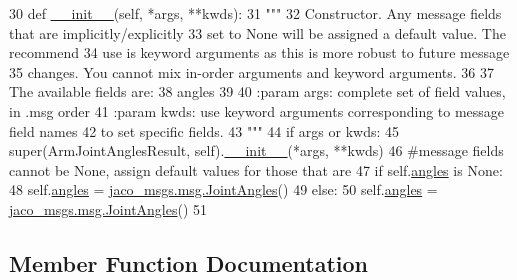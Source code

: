 \begin{DoxyCode}
30   \textcolor{keyword}{def }\hyperlink{classjaco__msgs_1_1msg_1_1__ArmJointAnglesResult_1_1ArmJointAnglesResult_a6584c0dc3193587ef66dc2ead0fc19c3}{\_\_init\_\_}(self, *args, **kwds):
31     \textcolor{stringliteral}{"""}
32 \textcolor{stringliteral}{    Constructor. Any message fields that are implicitly/explicitly}
33 \textcolor{stringliteral}{    set to None will be assigned a default value. The recommend}
34 \textcolor{stringliteral}{    use is keyword arguments as this is more robust to future message}
35 \textcolor{stringliteral}{    changes.  You cannot mix in-order arguments and keyword arguments.}
36 \textcolor{stringliteral}{}
37 \textcolor{stringliteral}{    The available fields are:}
38 \textcolor{stringliteral}{       angles}
39 \textcolor{stringliteral}{}
40 \textcolor{stringliteral}{    :param args: complete set of field values, in .msg order}
41 \textcolor{stringliteral}{    :param kwds: use keyword arguments corresponding to message field names}
42 \textcolor{stringliteral}{    to set specific fields.}
43 \textcolor{stringliteral}{    """}
44     \textcolor{keywordflow}{if} args \textcolor{keywordflow}{or} kwds:
45       super(ArmJointAnglesResult, self).\hyperlink{classjaco__msgs_1_1msg_1_1__ArmJointAnglesResult_1_1ArmJointAnglesResult_a6584c0dc3193587ef66dc2ead0fc19c3}{\_\_init\_\_}(*args, **kwds)
46       \textcolor{comment}{#message fields cannot be None, assign default values for those that are}
47       \textcolor{keywordflow}{if} self.\hyperlink{classjaco__msgs_1_1msg_1_1__ArmJointAnglesResult_1_1ArmJointAnglesResult_adf48c1897be485b663d0e2bf26308e07}{angles} \textcolor{keywordflow}{is} \textcolor{keywordtype}{None}:
48         self.\hyperlink{classjaco__msgs_1_1msg_1_1__ArmJointAnglesResult_1_1ArmJointAnglesResult_adf48c1897be485b663d0e2bf26308e07}{angles} = \hyperlink{classjaco__msgs_1_1msg_1_1__JointAngles_1_1JointAngles}{jaco\_msgs.msg.JointAngles}()
49     \textcolor{keywordflow}{else}:
50       self.\hyperlink{classjaco__msgs_1_1msg_1_1__ArmJointAnglesResult_1_1ArmJointAnglesResult_adf48c1897be485b663d0e2bf26308e07}{angles} = \hyperlink{classjaco__msgs_1_1msg_1_1__JointAngles_1_1JointAngles}{jaco\_msgs.msg.JointAngles}()
51 
\end{DoxyCode}


\subsection{Member Function Documentation}

